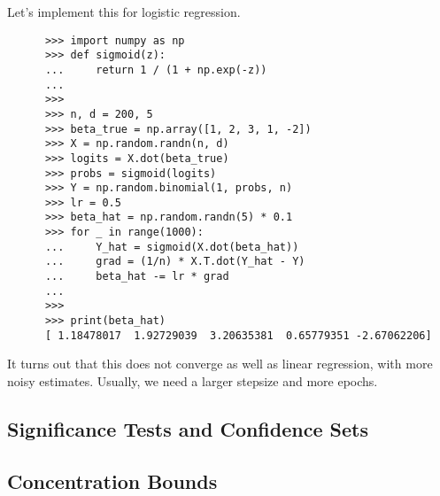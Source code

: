   \begin{example}
    Let's implement this for logistic regression. 

    \begin{lstlisting}
      >>> import numpy as np 
      >>> def sigmoid(z):
      ...     return 1 / (1 + np.exp(-z))
      ... 
      >>> 
      >>> n, d = 200, 5
      >>> beta_true = np.array([1, 2, 3, 1, -2])
      >>> X = np.random.randn(n, d)
      >>> logits = X.dot(beta_true)
      >>> probs = sigmoid(logits)
      >>> Y = np.random.binomial(1, probs, n)
      >>> lr = 0.5
      >>> beta_hat = np.random.randn(5) * 0.1
      >>> for _ in range(1000): 
      ...     Y_hat = sigmoid(X.dot(beta_hat))
      ...     grad = (1/n) * X.T.dot(Y_hat - Y)
      ...     beta_hat -= lr * grad  
      ... 
      >>> 
      >>> print(beta_hat)
      [ 1.18478017  1.92729039  3.20635381  0.65779351 -2.67062206]
    \end{lstlisting}
   
    It turns out that this does not converge as well as linear regression, with more noisy estimates. Usually, we need a larger stepsize and more epochs. 
  \end{example}

\subsection{Significance Tests and Confidence Sets}

\subsection{Concentration Bounds}

